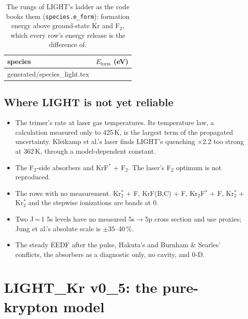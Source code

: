 \documentclass[11pt]{article}
\makeatletter
\newcommand{\Krts}{Kr\ensuremath{_2^*}}
\newcommand{\KrtF}{Kr\ensuremath{_2}F\ensuremath{^*}}
\newcommand{\Ft}{F\ensuremath{_2}}
\newcommand{\x}{\ensuremath{\times}}
\newcommand\tabinput[1]{\@@input generated/#1.tex }
\makeatother
\begin{document}
\begin{table}[H]
\small\centering
\begin{tabular}{@{}lr@{}}
\toprule
species & $E_\mathrm{form}$ (eV) \\
\midrule
\tabinput{species_light}
\bottomrule
\end{tabular}
\caption{The rungs of LIGHT's ladder as the code books them
(\texttt{species.e\_form}): formation energy above ground-state Kr and
\Ft{}, which every row's energy release is the difference of.}
\end{table}

\subsection{Where LIGHT is not yet reliable}
\begin{itemize}
\item The trimer's rate at laser gas temperatures. Its temperature law,
  a calculation measured only to 425\,K, is the largest term of the
  propagated uncertainty. Kleikamp et al.'s laser finds LIGHT's quenching
  \x2.2 too strong at 362\,K, through a model-dependent constant.
\item The \Ft{}-side absorbers and KrF$^*$ + \Ft{}. The laser's \Ft{}
  optimum is not reproduced.
\item The rows with no measurement. \Krts{} + F, KrF(B,C) + F, \KrtF{} + F,
  \Krts{} + \Krts{} and the stepwise ionizations are bands at 0.
\item Two J\,=\,1 5s levels have no measured 5s$\to$5p cross section and use
  proxies; Jung et al.'s absolute scale is $\pm 35$--40\,\%.
\item The steady EEDF after the pulse, Hakuta's and Burnham \& Searles'
  conflicts, the absorbers as a diagnostic only, no cavity, and 0-D.
\end{itemize}

\section{LIGHT\_Kr v0\_5: the pure-krypton model}
\end{document}
